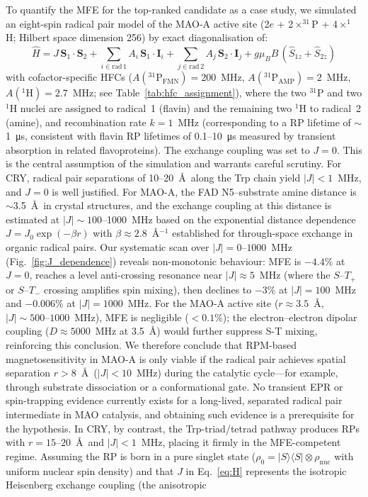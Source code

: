 \documentclass[11pt]{article}
\begin{document}
To quantify the MFE for the top-ranked candidate as a case study, we simulated an eight-spin radical pair model of the MAO-A active site (2$e$ + 2$\times^{31}$P + 4$\times^1$H; Hilbert space dimension 256) by exact diagonalisation of:
\begin{equation}
\hat{H} = J\,\mathbf{S}_1 \cdot \mathbf{S}_2 + \sum_{i \in \mathrm{rad}\,1} A_i\,\mathbf{S}_1 \cdot \mathbf{I}_i + \sum_{j \in \mathrm{rad}\,2} A_j\,\mathbf{S}_2 \cdot \mathbf{I}_j + g\mu_B B\,(\hat{S}_{1z} + \hat{S}_{2z})
\label{eq:H}
\end{equation}
with cofactor-specific HFCs ($A(^{31}\mathrm{P}_\mathrm{FMN}) = 200$~MHz\cite{Weber1998}, $A(^{31}\mathrm{P}_\mathrm{AMP}) = 2$~MHz, $A(^1\mathrm{H}) = 2.7$~MHz; see Table~\ref{tab:hfc_assignment}), where the two $^{31}$P and two $^1$H nuclei are assigned to radical~1 (flavin) and the remaining two $^1$H to radical~2 (amine), and recombination rate $k = 1$~MHz (corresponding to a RP lifetime of $\sim$1~\si{\micro\second}, consistent with flavin RP lifetimes of 0.1--10~\si{\micro\second} measured by transient absorption in related flavoproteins\cite{Maeda2012}). The exchange coupling was set to $J = 0$. This is the central assumption of the simulation and warrants careful scrutiny. For CRY, radical pair separations of 10--20~\AA\ along the Trp chain yield $|J| < 1$~MHz, and $J = 0$ is well justified\cite{Hiscock2016}. For MAO-A, the FAD N5--substrate amine distance is $\sim$3.5~\AA\ in crystal structures\cite{Edmondson2004main}, and the exchange coupling at this distance is estimated at $|J| \sim 100$--1000~MHz based on the exponential distance dependence $J = J_0 \exp(-\beta r)$ with $\beta \approx 2.8$~\AA$^{-1}$ established for through-space exchange in organic radical pairs\cite{Steiner1989}. Our systematic scan over $|J| = 0$--$1000$~MHz (Fig.~\ref{fig:J_dependence}) reveals non-monotonic behaviour: MFE is $-4.4\%$ at $J = 0$, reaches a level anti-crossing resonance near $|J| \approx 5$~MHz (where the $S$--$T_+$ or $S$--$T_-$ crossing amplifies spin mixing), then declines to $-3\%$ at $|J| = 100$~MHz and $-0.006\%$ at $|J| = 1000$~MHz. For the MAO-A active site ($r \approx 3.5$~\AA, $|J| \sim 500$--$1000$~MHz), MFE is negligible ($<0.1\%$); the electron--electron dipolar coupling ($D \approx 5000$~MHz at 3.5~\AA) would further suppress S-T mixing, reinforcing this conclusion. We therefore conclude that RPM-based magnetosensitivity in MAO-A is only viable if the radical pair achieves spatial separation $r > 8$~\AA\ ($|J| < 10$~MHz) during the catalytic cycle---for example, through substrate dissociation or a conformational gate. No transient EPR or spin-trapping evidence currently exists for a long-lived, separated radical pair intermediate in MAO catalysis\cite{Edmondson2004main}, and obtaining such evidence is a prerequisite for the hypothesis. In CRY, by contrast, the Trp-triad/tetrad pathway produces RPs with $r = 15$--$20$~\AA\ and $|J| < 1$~MHz, placing it firmly in the MFE-competent regime\cite{Hiscock2016}. Assuming the RP is born in a pure singlet state ($\rho_0 = |S\rangle\langle S| \otimes \rho_\mathrm{nuc}$ with uniform nuclear spin density) and that $J$ in Eq.~\ref{eq:H} represents the isotropic Heisenberg exchange coupling (the anisotropic 
\end{document}
